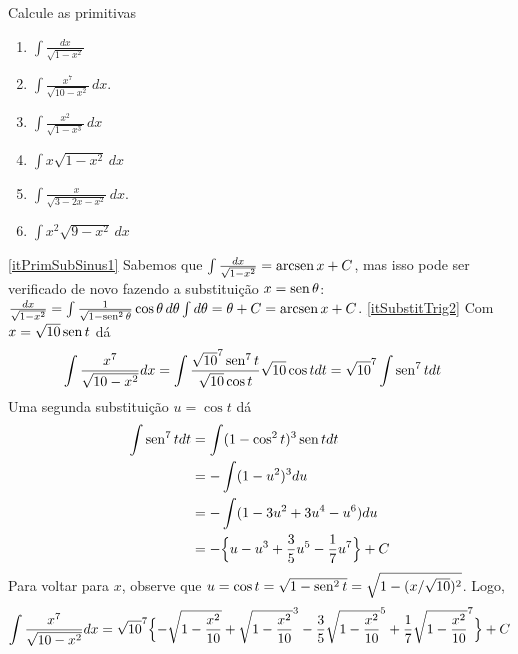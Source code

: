 \begin{exo} Calcule as primitivas
\begin{multicols}{3}
\begin{enumerate}
\item\label{itPrimSubSinus1} $\int \frac{dx}{\sqrt{1-x^2}}$
\item\label{itSubstitTrig2} $\int\frac{x^7}{\sqrt{10-x^2}}\,dx$.
\item\label{itPrimSubSinus3} $\int \frac{x^2}{\sqrt{1-x^3}}\,dx$
\item\label{itPrimSubSinus2} $\int x\sqrt{1-x^2}\,dx$
\item\label{itSubstitTrig6} $\int \frac{x}{\sqrt{3-2x-x^2}}\,dx$.
\item\label{itSubstitTrig000} $\int x^2{\sqrt{9-x^2}}\,dx$
\end{enumerate}
\end{multicols}
\vspace{0.01cm}
\begin{sol}
\eqref{itPrimSubSinus1}
Sabemos que $\int \frac{dx}{\sqrt{1-x^2}}=\operatorname{arcsen} x+C$, mas isso pode ser
verificado de novo fazendo a substituição $x=\operatorname{sen} \theta$:
$\frac{dx}{\sqrt{1-x^2}}=\int\frac{1}{\sqrt{1-\operatorname{sen}^2\theta}}\cos\theta\,
d\theta\int d\theta=\theta+C=\operatorname{arcsen} x+C$.
\eqref{itSubstitTrig2} Com $x=\sqrt{10}\operatorname{sen} t$ dá
\begin{align*}
\int\frac{x^7}{\sqrt{10-x^2}}dx=\int\frac{\sqrt{10}^7\operatorname{sen}^7t}{\sqrt{10}\cos
t}\sqrt{10}\cos tdt
&=\sqrt{10}^7\int \operatorname{sen}^7tdt
\end{align*}
Uma segunda substituição $u=\cos t$ dá
\begin{align*}
\int \operatorname{sen}^7tdt&=\int (1-\cos^2t)^3\operatorname{sen} tdt\\
\quad&=-\int(1-u^2)^3du\\
&=-\int(1-3u^2+3u^4-u^6)du \\
&=-\Big\{u-u^3+\frac{3}{5}u^5-\frac{1}{7}u^7\Big\}+C
\end{align*}
Para voltar para $x$, observe que $u=\cos
t=\sqrt{1-\operatorname{sen}^2t}=\sqrt{1-(x/\sqrt{10})^2}$.
Logo,
$$
\int\frac{x^7}{\sqrt{10-x^2}}dx=\sqrt{10}^7\Bigl\{-\sqrt{1-\frac{x^2}{10}}
+\sqrt{1-\frac{x^2}{10}}^3-\frac{3}{5}\sqrt{1-\frac{x^2}{10}}^5
+\frac{1}{7}\sqrt{1-\frac{x^2}{10}}^7\Bigr\}+C
$$
\end{sol}
\end{exo}
